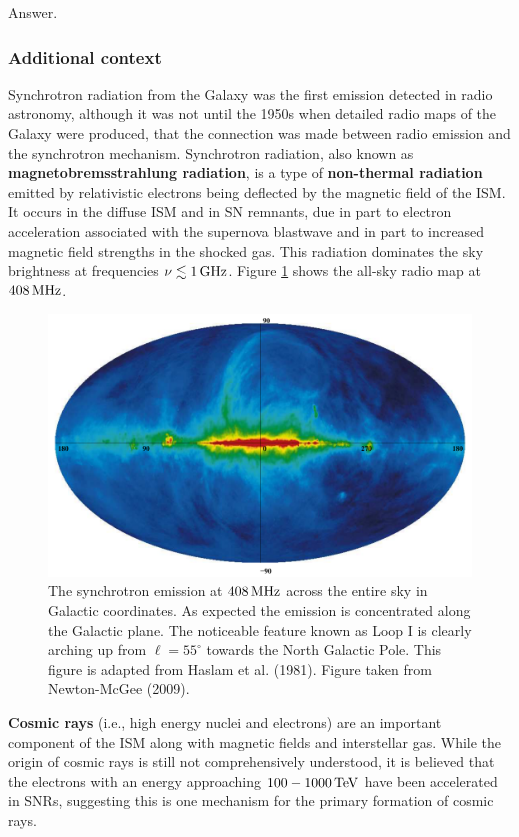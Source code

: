 \documentclass[a4paper,10pt]{article}
\begin{document}
Answer.

\subsubsection{Additional context}

Synchrotron radiation from the Galaxy was the first emission detected in radio astronomy, although it was not until the 1950s when detailed radio maps of the Galaxy were produced, that the connection was made between radio emission and the synchrotron mechanism. Synchrotron radiation, also known as \textbf{magnetobremsstrahlung radiation}, is a type of \textbf{non-thermal radiation} emitted by relativistic electrons being deflected by the magnetic field of the ISM. It occurs in the diffuse ISM and in SN remnants, due in part to electron acceleration associated with the supernova blastwave and in part to increased magnetic field strengths in the shocked gas. This radiation dominates the sky brightness at frequencies $\nu\lesssim1\,{\rm GHz}$. Figure \ref{fig:haslam408} shows the all-sky radio map at $408\,{\rm MHz}$.

\begin{figure}[h]
    \centering
    \includegraphics[width=12cm]{figures/Haslam408.png}
    \caption{\footnotesize{The synchrotron emission at $408\,{\rm MHz}$ across the entire sky in Galactic coordinates. As expected the emission is concentrated along the Galactic plane. The noticeable feature known as Loop I is clearly arching up from $\ell=55^\circ$ towards the North Galactic Pole. This figure is adapted from Haslam et al. (1981). Figure taken from Newton-McGee (2009).}}
    \label{fig:haslam408}
\end{figure}

{\noindent}\textbf{Cosmic rays} (i.e., high energy nuclei and electrons) are an important component of the ISM along with magnetic fields and interstellar gas. While the origin of cosmic rays is still not comprehensively understood, it is believed that the electrons with an energy approaching $100-1000\,{\rm TeV}$ have been accelerated in SNRs, suggesting this is one mechanism for the primary formation of cosmic rays.
\end{document}
